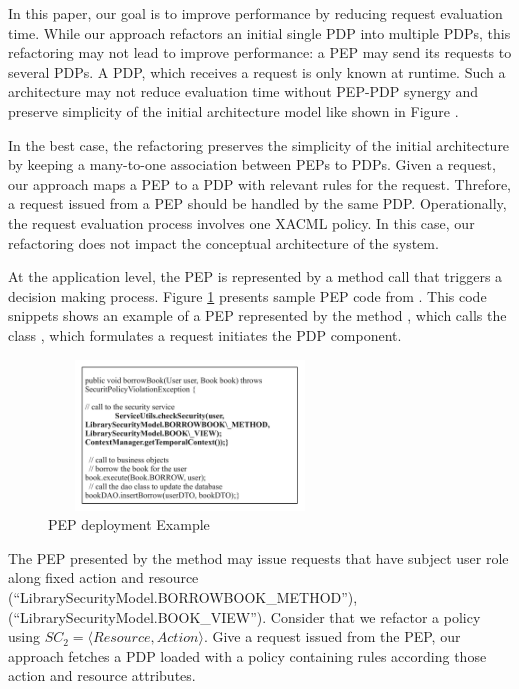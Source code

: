In this paper, our goal is to improve performance by reducing request evaluation time. While our approach refactors an initial single PDP into multiple PDPs, this refactoring may not lead to improve performance: a PEP 
may send its requests to several PDPs.
A PDP, which receives a request is only known at runtime.
Such a architecture may not reduce evaluation time without PEP-PDP synergy and preserve
simplicity of the initial architecture model like shown in Figure \cite{synergic-nonsynergic}.

In the best case, the refactoring preserves the simplicity of the initial architecture by keeping a many-to-one association
between PEPs to PDPs. Given a request, our approach maps a PEP to a PDP with relevant rules for the request.
Threfore, a request issued from a PEP should be handled by the same PDP. Operationally, the request evaluation process involves
one XACML policy. In this case, our refactoring does not impact the conceptual architecture of the system.




At the application level, the PEP is represented by a method call that triggers a decision making process.
Figure \ref{PEP deployment Example} presents sample PEP code from \cite{legacy}. This code snippets shows an example of a PEP represented by the method , which calls the class
, which formulates a request initiates the PDP component.

\begin{figure}[!h]
\begin{center}
\includegraphics[width=7.5cm, height=4cm]{PEPExample}
\caption{PEP deployment Example}
\label{PEP deployment Example}
\end{center}
\end{figure}

The PEP presented by the method  may issue requests that have subject user role along fixed action and resource (``LibrarySecurityModel.BORROWBOOK\_METHOD''), (``LibrarySecurityModel.BOOK\_VIEW'').
Consider that we refactor a policy using $SC_{2}=\langle Resource,Action\rangle$.
Give a request issued from the PEP, our approach fetches a PDP loaded with a policy containing rules according those action and resource attributes.


